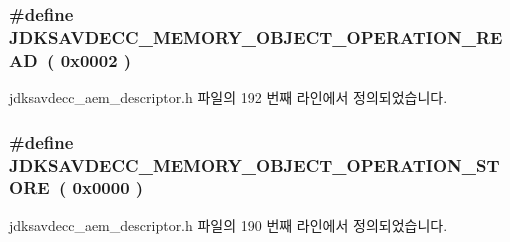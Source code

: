 \subsubsection[{\texorpdfstring{J\+D\+K\+S\+A\+V\+D\+E\+C\+C\+\_\+\+M\+E\+M\+O\+R\+Y\+\_\+\+O\+B\+J\+E\+C\+T\+\_\+\+O\+P\+E\+R\+A\+T\+I\+O\+N\+\_\+\+R\+E\+AD}{JDKSAVDECC_MEMORY_OBJECT_OPERATION_READ}}]{\setlength{\rightskip}{0pt plus 5cm}\#define J\+D\+K\+S\+A\+V\+D\+E\+C\+C\+\_\+\+M\+E\+M\+O\+R\+Y\+\_\+\+O\+B\+J\+E\+C\+T\+\_\+\+O\+P\+E\+R\+A\+T\+I\+O\+N\+\_\+\+R\+E\+AD~( 0x0002 )}\hypertarget{group__memory__object__operation_ga8279f99b6cec699e7cd98bd83eac7efb}{}\label{group__memory__object__operation_ga8279f99b6cec699e7cd98bd83eac7efb}


jdksavdecc\+\_\+aem\+\_\+descriptor.\+h 파일의 192 번째 라인에서 정의되었습니다.

\subsubsection[{\texorpdfstring{J\+D\+K\+S\+A\+V\+D\+E\+C\+C\+\_\+\+M\+E\+M\+O\+R\+Y\+\_\+\+O\+B\+J\+E\+C\+T\+\_\+\+O\+P\+E\+R\+A\+T\+I\+O\+N\+\_\+\+S\+T\+O\+RE}{JDKSAVDECC_MEMORY_OBJECT_OPERATION_STORE}}]{\setlength{\rightskip}{0pt plus 5cm}\#define J\+D\+K\+S\+A\+V\+D\+E\+C\+C\+\_\+\+M\+E\+M\+O\+R\+Y\+\_\+\+O\+B\+J\+E\+C\+T\+\_\+\+O\+P\+E\+R\+A\+T\+I\+O\+N\+\_\+\+S\+T\+O\+RE~( 0x0000 )}\hypertarget{group__memory__object__operation_gab4290dead4205aeac08817e43dea0950}{}\label{group__memory__object__operation_gab4290dead4205aeac08817e43dea0950}


jdksavdecc\+\_\+aem\+\_\+descriptor.\+h 파일의 190 번째 라인에서 정의되었습니다.

